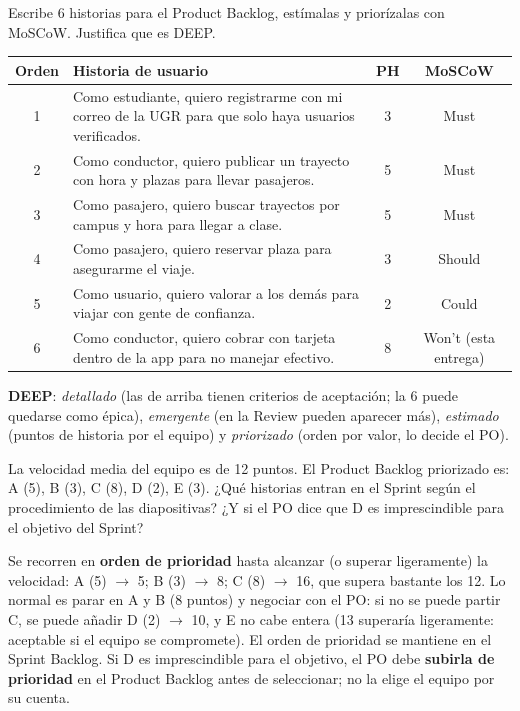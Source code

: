 \documentclass[11pt,a4paper,oneside,openany]{report}
\begin{document}
\begin{ejercicio}
Escribe 6 historias para el Product Backlog, estímalas y priorízalas con MoSCoW. Justifica que es DEEP.
\end{ejercicio}
\begin{center}\small
\begin{tabular}{cp{9.6cm}cc}
\toprule
\textbf{Orden} & \textbf{Historia de usuario} & \textbf{PH} & \textbf{MoSCoW} \\ \midrule
1 & Como estudiante, quiero registrarme con mi correo de la UGR para que solo haya usuarios verificados. & 3 & Must \\
2 & Como conductor, quiero publicar un trayecto con hora y plazas para llevar pasajeros. & 5 & Must \\
3 & Como pasajero, quiero buscar trayectos por campus y hora para llegar a clase. & 5 & Must \\
4 & Como pasajero, quiero reservar plaza para asegurarme el viaje. & 3 & Should \\
5 & Como usuario, quiero valorar a los demás para viajar con gente de confianza. & 2 & Could \\
6 & Como conductor, quiero cobrar con tarjeta dentro de la app para no manejar efectivo. & 8 & Won't (esta entrega) \\
\bottomrule
\end{tabular}
\end{center}
\textbf{DEEP}: \emph{detallado} (las de arriba tienen criterios de aceptación; la 6 puede quedarse como épica),
\emph{emergente} (en la Review pueden aparecer más), \emph{estimado} (puntos de historia por el equipo) y
\emph{priorizado} (orden por valor, lo decide el PO).

\begin{ejercicio}
La velocidad media del equipo es de 12 puntos. El Product Backlog priorizado es: A (5), B (3), C (8), D (2), E (3).
¿Qué historias entran en el Sprint según el procedimiento de las diapositivas? ¿Y si el PO dice que D es imprescindible
para el objetivo del Sprint?
\end{ejercicio}
Se recorren en \textbf{orden de prioridad} hasta alcanzar (o superar ligeramente) la velocidad: A (5) $\to$ 5; B (3) $\to$
8; C (8) $\to$ 16, que supera bastante los 12. Lo normal es parar en A y B (8 puntos) y negociar con el PO: si no se
puede partir C, se puede añadir D (2) $\to$ 10, y E no cabe entera (13 superaría ligeramente: aceptable si el equipo se
compromete). El orden de prioridad se mantiene en el Sprint Backlog. Si D es imprescindible para el objetivo, el PO
debe \textbf{subirla de prioridad} en el Product Backlog antes de seleccionar; no la elige el equipo por su cuenta.
\end{document}
